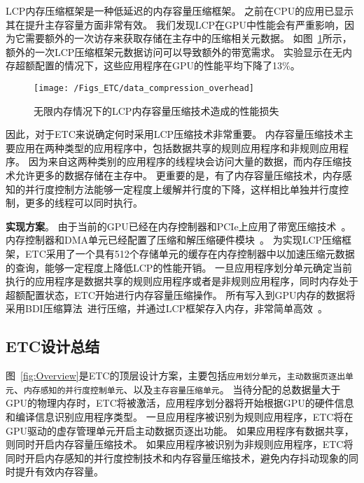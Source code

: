 LCP内存压缩框架是一种低延迟的内存容量压缩框架。
之前在CPU的应用已显示其在提升主存容量方面非常有效。
我们发现LCP在GPU中性能会有严重影响，因为它需要额外的一次访存来获取存储在主存中的压缩相关元数据。
如图~\ref{fig:data_compression_overhead}所示，额外的一次LCP压缩框架元数据访问可以导致额外的带宽需求。
实验显示在无内存超额配置的情况下，这些应用程序在GPU的性能平均下降了13\%。




\begin{figure}[htbp] %
  \centering
  \texttt{[image: /Figs\_ETC/data\_compression\_overhead]}
  \caption{无限内存情况下的LCP内存容量压缩技术造成的性能损失}
  \label{fig:data_compression_overhead}
\end{figure}

因此，对于ETC来说确定何时采用LCP压缩技术非常重要。
内存容量压缩技术主要应用在两种类型的应用程序中，包括数据共享的规则应用程序和非规则应用程序。
因为来自这两种类别的应用程序的线程块会访问大量的数据，而内存压缩技术允许更多的数据存储在主存中。
更重要的是，有了内存容量压缩技术，内存感知的并行度控制方法能够一定程度上缓解并行度的下降，这样相比单独并行度控制，更多的线程可以同时执行。

\textbf{实现方案}。
由于当前的GPU已经在内存控制器和PCIe上应用了带宽压缩技术~。
内存控制器和DMA单元已经配置了压缩和解压缩硬件模块~。
为实现LCP压缩框架，ETC采用了一个具有512个存储单元的缓存在内存控制器中以加速压缩元数据的查询，能够一定程度上降低LCP的性能开销。
一旦应用程序划分单元确定当前执行的应用程序是数据共享的规则应用程序或者是非规则应用程序，同时内存处于超额配置状态，ETC开始进行内存容量压缩操作。
所有写入到GPU内存的数据将采用BDI压缩算法~进行压缩，并通过LCP框架存入内存，非常简单高效~。

\subsection{ETC设计总结}
图~\ref{fig:Overview}是ETC的顶层设计方案，主要包括\texttt{应用划分单元}，\texttt{主动数据页逐出单元}、\texttt{内存感知的并行度控制单元}、以及\texttt{主存容量压缩单元}。
当待分配的总数据量大于GPU的物理内存时，ETC将被激活，应用程序划分器将开始根据GPU的硬件信息和编译信息识别应用程序类型。
一旦应用程序被识别为规则应用程序，ETC将在GPU驱动的虚存管理单元开启主动数据页逐出功能。
如果应用程序有数据共享，则同时开启内存容量压缩技术。
如果应用程序被识别为非规则应用程序，ETC将同时开启内存感知的并行度控制技术和内存容量压缩技术，避免内存抖动现象的同时提升有效内存容量。

